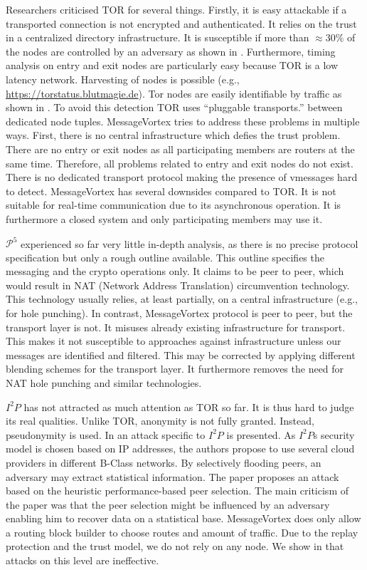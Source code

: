 \documentclass[runningheads]{llncs}
\begin{document}
Researchers criticised TOR for several things. Firstly, it is easy attackable if a transported connection is not  encrypted and authenticated. It relies on the trust in a centralized directory infrastructure. It is susceptible if more than $\approx 30\%$ of the nodes are controlled by an adversary as shown in \cite{jansen2014sniper}. Furthermore, timing analysis on entry and exit nodes are particularly easy because TOR is a low latency network\cite{torta05,esorics10-bandwidth}. Harvesting of nodes is possible (e.g., \url{https://torstatus.blutmagie.de}). Tor nodes are easily identifiable by traffic as shown in \cite{foci12-winter}. To avoid this detection TOR uses ``pluggable transports.'' between dedicated node tuples. MessageVortex tries to address these problems in multiple ways. First, there is no central infrastructure which defies the trust problem. There are no entry or exit nodes as all participating members are routers at the same time. Therefore, all problems related to entry and exit nodes do not exist. There is no dedicated transport protocol making the presence of vmessages hard to detect. MessageVortex has several downsides compared to TOR. It is not suitable for real-time communication due to its asynchronous operation. It is furthermore a closed system and only participating members may use it. 

$\mathcal{P}^5$ experienced so far very little in-depth analysis, as there is no precise protocol specification but only a rough outline available. This outline specifies the messaging and the crypto operations only. It claims to be peer to peer, which would result in NAT (Network Address Translation) circumvention technology. This technology usually relies, at least partially, on a central infrastructure (e.g., for hole punching). In contrast, MessageVortex protocol is peer to peer, but the transport layer is not. It misuses already existing infrastructure for transport. This makes it not susceptible to approaches against infrastructure unless our messages are identified and filtered. This may be corrected by applying different blending schemes for the transport layer. It furthermore removes the need for NAT hole punching and similar technologies.

$I^2P$ has not attracted as much attention as TOR so far. It is thus hard to judge its real qualities. Unlike TOR, anonymity is not fully granted. Instead, pseudonymity is used. In \cite{pets2011-i2p} an attack specific to $I^2P$ is presented. As $I^2P$s security model is chosen based on IP addresses, the authors propose to use several cloud providers in different B-Class networks. By selectively flooding peers, an adversary may extract statistical information. The paper proposes an attack based on the heuristic performance-based peer selection. The main criticism of the paper was that the peer selection might be influenced by an adversary enabling him to recover data on a statistical base. MessageVortex does only allow a routing block builder to choose routes and amount of traffic. Due to the replay protection and the trust model, we do not rely on any node. We show in \cite{messageVortex} that attacks on this level are ineffective.
\end{document}
